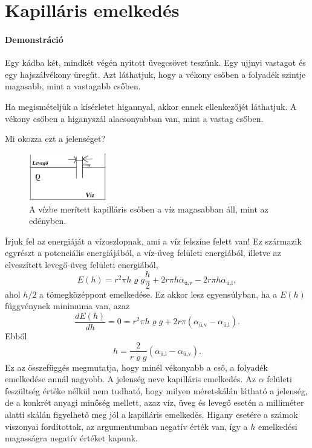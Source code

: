 \documentclass[12pt,a4paper]{scrartcl}
\begin{document}
\section{Kapilláris emelkedés}

\footnotesize
\paragraph{Demonstráció}
Egy kádba két, mindkét végén nyitott üvegcsövet teszünk. Egy ujjnyi vastagot és egy hajszálvékony üregűt. Azt láthatjuk, hogy a vékony csőben a folyadék szintje magasabb, mint a vastagabb csőben.

Ha megismételjük a kísérletet higannyal, akkor ennek ellenkezőjét láthatjuk. A vékony csőben a higanyszál alacsonyabban van, mint a vastag csőben.

Mi okozza ezt a jelenséget?
\normalsize

\begin{figure}[htbp]
	\begin{center}
		\includegraphics[width=0.3\textwidth]{tetel74.png}
		\caption{A vízbe merített kapilláris csőben a víz magasabban áll, mint az edényben.}
	\end{center}
\end{figure}

Írjuk fel az energiáját a vízoszlopnak, ami a víz felszíne felett van! Ez származik egyrészt a potenciális energiájából, a víz-üveg felületi energiából, illetve az elveszített levegő-üveg felületi energiából,
\[E\left( h \right) = {r^2}\pi h\varrho g\frac{h}{2} + 2r\pi h{\alpha _{{\text{ü,v}}}} - 2r\pi h{\alpha _{{\text{ü,l}}}},\]
ahol $h/2$ a tömegközéppont emelkedése. Ez akkor lesz egyensúlyban, ha a $E\left( h \right)$ függvénynek minimuma van, azaz
\[\frac{{dE\left( h \right)}}{{dh}} = 0 = {r^2}\pi h\varrho g + 2r\pi \left( {{\alpha _{{\text{ü,v}}}} - {\alpha _{{\text{ü,l}}}}} \right).\] 
Ebből
\begin{equation} \label{eq:kapillaris_emelkedes}
h = \frac{{2}}{{r \varrho g}}\left( {{\alpha _{{\text{ü,l}}}} - {\alpha _{{\text{ü,v}}}}} \right).
\end{equation}
Ez az összefüggés megmutatja, hogy minél vékonyabb a cső, a folyadék emelkedése annál nagyobb. A jelenség neve kapilláris emelkedés. Az $\alpha$ felületi feszültség értéke nélkül nem tudható, hogy milyen méretskálán látható a jelenség, de a konkrét anyagi minőség mellett, azaz víz, üveg és levegő esetén a milliméter alatti skálán figyelhető meg jól a kapilláris emelkedés. Higany esetére a számok viszonyai fordítottak, az argumentumban negatív érték van, így a $h$ emelkedési magasságra negatív értéket kapunk.
\footnotesize
\end{document}
